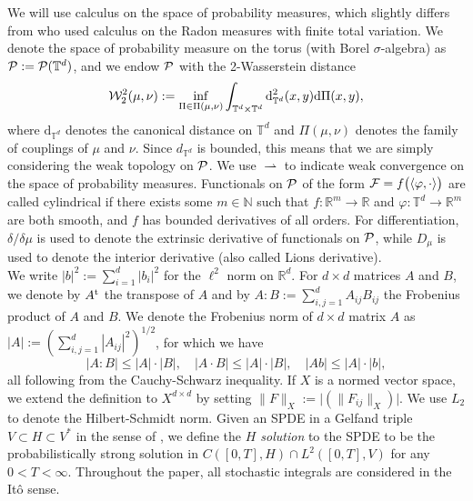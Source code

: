We will use calculus on the space of probability measures, which slightly differs from \cite{KLvR19} who used calculus on the Radon measures with finite total variation. We denote the space of probability measure on the torus (with Borel $\sigma$-algebra) as $\mathcal{P} := \mathcal{P}(\mathbb{T}^d)$, and we endow $\mathcal{P}$ with the 2-Wasserstein distance
\begin{equation*}
    \mathcal{W}_{2}^2(\mu,\nu) := \inf_{\Pi \in \Pi(\mu,\nu)} \int_{\mathbb{T}^d \times \mathbb{T}^d}\mathrm{d}^2_{\mathbb{T}^d}(x,y)\mathrm{d}\Pi(x,y),
\end{equation*}
where $\mathrm{d}_{\mathbb{T}^d}$ denotes the canonical distance on $\mathbb{T}^d$ and $\Pi(\mu,\nu)$ denotes the family of couplings of $\mu$ and $\nu$. Since $d_{\mathbb{T}^d}$ is bounded, this means that we are simply considering the weak topology on $\mathcal{P}$. We use $\rightharpoonup$ to indicate weak convergence on the space of probability measures. Functionals on $\mathcal{P}$ of the form $\mathcal{F} = f\big(\langle \varphi, \cdot \rangle\big)$ are called cylindrical if there exists some $m \in \mathbb{N}$ such that $f: \mathbb{R}^m \to \mathbb{R}$ and $\varphi: \mathbb{T}^d \to \mathbb{R}^m$ are both smooth, and $f$ has bounded derivatives of all orders. For differentiation, $\delta/\delta \mu$ is used to denote the extrinsic derivative of functionals on $\mathcal{P}$, while $D_{\mu}$ is used to denote the interior derivative (also called Lions derivative).  \\

We write $|b|^2 := \sum_{i = 1}^d |b_i|^2$ for the $\ell^2$ norm on $\mathbb R^d$. For $d \times d$ matrices $A$ and $B$, we denote by $A^{\operatorname{t}}$ the transpose of $A$ and by $A:B := \sum_{i,j=1}^d A_{ij}B_{ij}$ the Frobenius product of $A$ and $B$. We denote the Frobenius norm of $d \times d$ matrix $A$ as $|A| := (\sum_{i,j = 1}^d |A_{ij}|^2)^{1/2}$, for which we have 
\begin{equation}\label{eq:matrix_bound}
    |A:B| \leq |A|\cdot|B|, \quad |A\cdot B| \leq |A|\cdot |B|, \quad |Ab| \leq |A|\cdot|b|,
\end{equation}
all following from the Cauchy-Schwarz inequality. If $X$ is a normed vector space, we extend the definition to $X^{d \times d}$ by setting $\|F\|_{X} := \big|(\|F_{ij}\|_{X})\big|$. We use $L_2$ to denote the Hilbert-Schmidt norm. Given an SPDE in a Gelfand triple $V \subset H \subset V^{\ast}$ in the sense of \cite{LR15}, we define the \emph{$H$ solution} to the SPDE to be the probabilistically strong solution in $C([0,T],H) \cap L^2([0,T],V)$ for any $0< T < \infty$. Throughout the paper, all stochastic integrals are considered in the It\^o sense.


